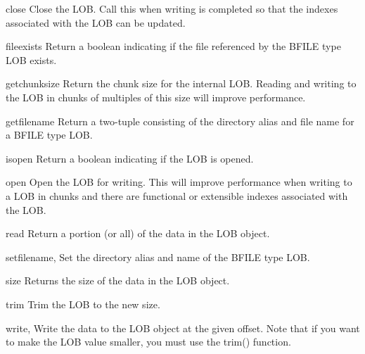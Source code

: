 \documentclass{manual}
\begin{document}
\begin{funcdesc}{close}{}
  Close the LOB. Call this when writing is completed so that the indexes
  associated with the LOB can be updated.
\end{funcdesc}
\begin{funcdesc}{fileexists}{}
  Return a boolean indicating if the file referenced by the BFILE type LOB
  exists.
\end{funcdesc}

\begin{funcdesc}{getchunksize}{}
  Return the chunk size for the internal LOB. Reading and writing to the LOB
  in chunks of multiples of this size will improve performance.
\end{funcdesc}

\begin{funcdesc}{getfilename}{}
  Return a two-tuple consisting of the directory alias and file name for a
  BFILE type LOB.
\end{funcdesc}

\begin{funcdesc}{isopen}{}
  Return a boolean indicating if the LOB is opened.
\end{funcdesc}

\begin{funcdesc}{open}{}
  Open the LOB for writing. This will improve performance when writing to a LOB
  in chunks and there are functional or extensible indexes associated with the
  LOB.
\end{funcdesc}

\begin{funcdesc}{read}{}
  Return a portion (or all) of the data in the LOB object.
\end{funcdesc}

\begin{funcdesc}{setfilename}{, }
  Set the directory alias and name of the BFILE type LOB.
\end{funcdesc}

\begin{funcdesc}{size}{}
  Returns the size of the data in the LOB object.
\end{funcdesc}

\begin{funcdesc}{trim}{}
  Trim the LOB to the new size.
\end{funcdesc}

\begin{funcdesc}{write}{, }
  Write the data to the LOB object at the given offset. Note that if you want
  to make the LOB value smaller, you must use the trim() function.
\end{funcdesc}
\end{document}

